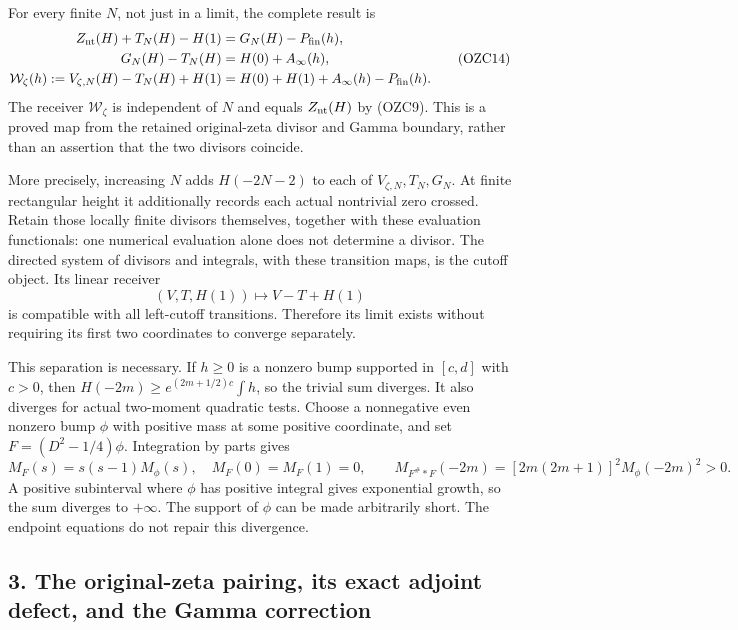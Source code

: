 \documentclass[
  10pt,
  a4paper,
]{article}
\begin{document}
For every finite \(N\), not just in a limit, the complete result is \[
\begin{aligned}
Z_{\rm nt}(H)+T_N(H)-H(1)
 &=G_N(H)-P_{\rm fin}(h),\\
G_N(H)-T_N(H)&=H(0)+A_\infty(h),\\
\mathcal W_\zeta(h)
 :=V_{\zeta,N}(H)-T_N(H)+H(1)
 &=H(0)+H(1)+A_\infty(h)-P_{\rm fin}(h).
\end{aligned}
\tag{OZC14}
\] The receiver \(\mathcal W_\zeta\) is independent of \(N\) and equals
\(Z_{\rm nt}(H)\) by (OZC9). This is a proved map from the retained
original-zeta divisor and Gamma boundary, rather than an assertion that
the two divisors coincide.

More precisely, increasing \(N\) adds \(H(-2N-2)\) to each of
\(V_{\zeta,N},T_N,G_N\). At finite rectangular height it additionally
records each actual nontrivial zero crossed. Retain those locally finite
divisors themselves, together with these evaluation functionals: one
numerical evaluation alone does not determine a divisor. The directed
system of divisors and integrals, with these transition maps, is the
cutoff object. Its linear receiver \[
(V,T,H(1))\longmapsto V-T+H(1)
\tag{OZC15}
\] is compatible with all left-cutoff transitions. Therefore its limit
exists without requiring its first two coordinates to converge
separately.

This separation is necessary. If \(h\ge0\) is a nonzero bump supported
in \([c,d]\) with \(c>0\), then \(H(-2m)\ge e^{(2m+1/2)c}\int h\), so
the trivial sum diverges. It also diverges for actual two-moment
quadratic tests. Choose a nonnegative even nonzero bump \(\phi\) with
positive mass at some positive coordinate, and set \(F=(D^2-1/4)\phi\).
Integration by parts gives \[
M_F(s)=s(s-1)M_\phi(s),\quad M_F(0)=M_F(1)=0,\qquad
M_{F^\#*F}(-2m)=[2m(2m+1)]^2M_\phi(-2m)^2>0.
\tag{OZC16}
\] A positive subinterval where \(\phi\) has positive integral gives
exponential growth, so the sum diverges to \(+\infty\). The support of
\(\phi\) can be made arbitrarily short. The endpoint equations do not
repair this divergence.

\subsection{3. The original-zeta pairing, its exact adjoint defect, and
the Gamma
correction}\label{the-original-zeta-pairing-its-exact-adjoint-defect-and-the-gamma-correction}
\end{document}
